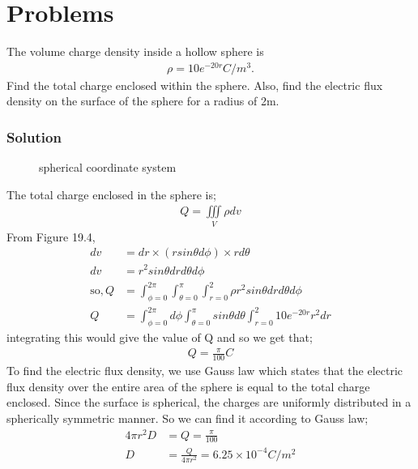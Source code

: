 \section{Problems}
\begin{exmp}
The volume charge density inside a hollow sphere is 
\begin{align*}
\rho=10e^{-20r} C/m^{3}.
\end{align*}
Find the total charge enclosed within the sphere. Also, find the electric flux density on the surface of the sphere for a radius of 2m.

\subsubsection*{Solution}
\begin{figure}[h]
\centering
\caption{spherical coordinate system}
\end{figure} 

The total charge enclosed in the sphere is;
\begin{align*}
Q=\iiint\limits_V\rho dv
\end{align*}
From Figure 19.4, 
\begin{align*}
dv &= dr\times(rsin\theta d\phi)\times rd\theta \\
dv&=r^{2}sin\theta drd\theta d\phi\\
\text{so}, Q&=\int^{2\pi}_{\phi=0}\int^{\pi}_{\theta=0}\int^{2}_{r=0} \rho r^{2}sin\theta drd\theta d\phi\\
Q&= \int^{2\pi}_{\phi=0}d\phi\int^{\pi}_{\theta=0}sin\theta d\theta\int^{2}_{r=0}10e^{-20r}r^{2}dr
\end{align*}
integrating this would give the value of Q and so we get that;
\begin{align*}
Q=\frac{\pi}{100} C
\end{align*}
To find the electric flux density, we use Gauss law which states that the electric flux density over the entire area of the sphere is equal to the total charge enclosed. Since the surface is spherical, the charges are uniformly distributed in a spherically symmetric manner. So we can find it according to Gauss law;
\begin{align*}
4\pi r^{2}D&=Q=\frac{\pi}{100}\\
D&=\frac{Q}{4\pi r^{2}}= 6.25\times10^{-4} C/m^{2}
\end{align*}
\end{exmp}

